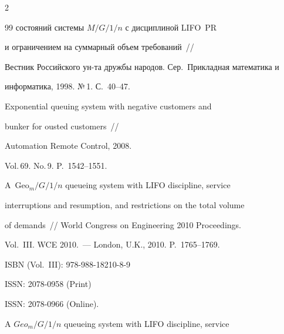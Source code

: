 \begin{multicols}{2}
{{\begin{thebibliography}{99}
состояний системы $M/G/1/n$ с дисциплиной LIFO\ PR\/


и ограничением на суммарный объем требований~//


Вестник Российского ун-та дружбы народов. Сер.\ Прикладная математика и


информатика, 1998. №\,1. С.~40--47.

















Exponential queuing system with negative customers and 


bunker for ousted customers~// 


Automation Remote Control, 2008.


Vol.\,69. No.\,9. P.~1542--1551.




















A~Geo$_m/G/1/n$ queueing system with LIFO discipline, service


interruptions and resumption, and restrictions on the total volume


of demands~// World Congress on Engineering 2010 Proceedings.


Vol.~III. WCE 2010.~--- London, U.K., 2010. P.~1765--1769. 


ISBN (Vol.~III):  978-988-18210-8-9


ISSN: 2078-0958 (Print)


ISSN: 2078-0966 (Online).














A $Geo_m/G/1/n$ queueing system with LIFO discipline, service



\end{thebibliography}}}
\end{multicols}
